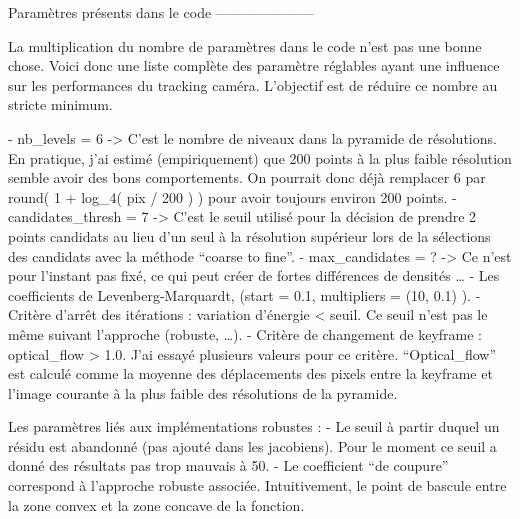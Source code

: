Paramètres présents dans le code
---------------------

La multiplication du nombre de paramètres dans le code n’est pas une bonne chose. Voici donc une liste complète des paramètre réglables ayant une influence sur les performances du tracking caméra. L’objectif est de réduire ce nombre au stricte minimum.

- nb\_levels = 6 -> C’est le nombre de niveaux dans la pyramide de résolutions. En pratique, j’ai estimé (empiriquement) que 200 points à la plus faible résolution semble avoir des bons comportements. On pourrait donc déjà remplacer 6 par round( 1 + log\_4( pix / 200 ) ) pour avoir toujours environ 200 points.
- candidates\_thresh = 7 -> C’est le seuil utilisé pour la décision de prendre 2 points candidats au lieu d’un seul à la résolution supérieur lors de la sélections des candidats avec la méthode “coarse to fine”.
- max\_candidates = ? -> Ce n’est pour l’instant pas fixé, ce qui peut créer de fortes différences de densités …
- Les coefficients de Levenberg-Marquardt, (start = 0.1, multipliers = (10, 0.1) ).
- Critère d’arrêt des itérations : variation d’énergie < seuil. Ce seuil n’est pas le même suivant l’approche (robuste, …).
- Critère de changement de keyframe : optical\_flow > 1.0. J’ai essayé plusieurs valeurs pour ce critère. “Optical\_flow” est calculé comme la moyenne des déplacements des pixels entre la keyframe et l’image courante à la plus faible des résolutions de la pyramide.

Les paramètres liés aux implémentations robustes :
- Le seuil à partir duquel un résidu est abandonné (pas ajouté dans les jacobiens). Pour le moment ce seuil a donné des résultats pas trop mauvais à 50.
- Le coefficient “de coupure” correspond à l’approche robuste associée. Intuitivement, le point de bascule entre la zone convex et la zone concave de la fonction.

